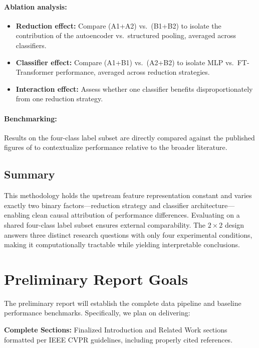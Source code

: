 \documentclass[10pt,twocolumn,letterpaper]{article}
\begin{document}
\paragraph{Ablation analysis:}
\begin{itemize}
    \item \textbf{Reduction effect:} Compare (A1+A2) vs.\ (B1+B2) to isolate the contribution of the autoencoder vs.\ structured pooling, averaged across classifiers.
    \item \textbf{Classifier effect:} Compare (A1+B1) vs.\ (A2+B2) to isolate MLP vs.\ FT-Transformer performance, averaged across reduction strategies.
    \item \textbf{Interaction effect:} Assess whether one classifier benefits disproportionately from one reduction strategy.
\end{itemize}

\paragraph{Benchmarking:}
Results on the four-class label subset are directly compared against the published figures of \cite{zheng2022} to contextualize performance relative to the broader literature.


\subsection{Summary}

This methodology holds the upstream feature representation constant and varies exactly two binary factors—reduction strategy and classifier architecture—enabling clean causal attribution of performance differences. Evaluating on a shared four-class label subset ensures external comparability. The $2 \times 2$ design answers three distinct research questions with only four experimental conditions, making it computationally tractable while yielding interpretable conclusions.


\section{Preliminary Report Goals}

The preliminary report will establish the complete data pipeline and baseline performance benchmarks. Specifically, we plan on delivering:

\textbf{Complete Sections:} Finalized Introduction and Related Work sections formatted per IEEE CVPR guidelines, including properly cited references.
\end{document}
